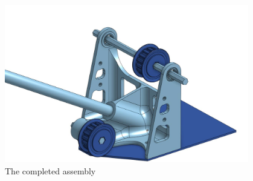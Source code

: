 \begin{figure}[htp]
\centering
\includegraphics[width=0.95\textwidth, angle=0]{Meetings/November/11-18-21/11-18-21_CAD_Figure5.JPG}
\caption{The completed assembly}
\label{fig:111821_5}
\end{figure}



